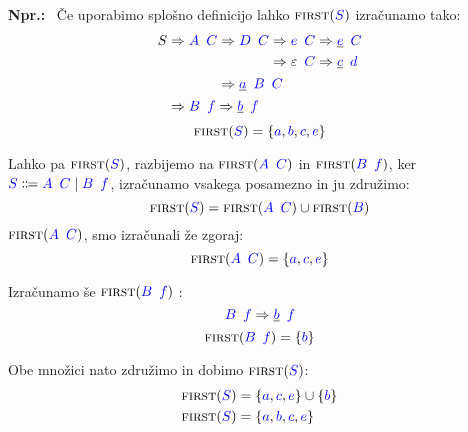 \documentclass{article}
\newcommand{\Ex}{\textbf{Npr.:}\ }
\newcommand{\FIRST}{\textsc{first}}
\newcommand{\Symbol}[1]{\textcolor{blue}{#1}}
\newcommand{\Null}{\varepsilon}
\newcommand{\Arrow}{\Coloneq}
\newcommand{\Derive}{\Rightarrow}
\newcommand{\Seq}{{\ \,}}
\newcommand{\Union}{\mathrel{|}}
\begin{document}
\Ex
Če uporabimo splošno definicijo lahko $\FIRST(\Symbol{S})$ izračunamo tako:
\begin{equation*}
  S \begin{aligned}[t]
    &\Derive \Symbol{A} \Seq \Symbol{C} \begin{aligned}[t]
      &\Derive \Symbol{D} \Seq \Symbol{C} \begin{aligned}[t]
        &\Derive \Symbol{e} \Seq \Symbol{C} \Derive \underline{\Symbol{e}} \Seq \Symbol{C} \\
        &\Derive \Null \Seq \Symbol{C} \Derive \underline{\Symbol{c}} \Seq \Symbol{d} \\
      \end{aligned}\\
      &\Derive \underline{\Symbol{a}} \Seq \Symbol{B} \Seq \Symbol{C}
    \end{aligned}\\
    &\Derive \Symbol{B} \Seq \Symbol{f} \Derive \underline{\Symbol{b}} \Seq \Symbol{f}
  \end{aligned}
\end{equation*}
\begin{equation*}
  \FIRST(\Symbol{S}) = \{\Symbol{a}, \Symbol{b}, \Symbol{c}, \Symbol{e}\}
\end{equation*}

Lahko pa $\FIRST(\Symbol{S})$, razbijemo na $\FIRST(\Symbol{A} \Seq \Symbol{C})$ in $\FIRST(\Symbol{B} \Seq \Symbol{f})$, ker $\Symbol{S} \Arrow \Symbol{A} \Seq \Symbol{C} \Union \Symbol{B} \Seq \Symbol{f}$, izračunamo vsakega posamezno in ju združimo:
\begin{equation*}
  \FIRST(\Symbol{S}) = \FIRST(\Symbol{A} \Seq \Symbol{C}) \cup \FIRST(\Symbol{B})
\end{equation*}
$\FIRST(\Symbol{A} \Seq \Symbol{C})$, smo izračunali že zgoraj:
\begin{equation*}
  \FIRST(\Symbol{A} \Seq \Symbol{C}) = \{\Symbol{a}, \Symbol{c}, \Symbol{e}\}
\end{equation*}

Izračunamo še $\FIRST(\Symbol{B} \Seq \Symbol{f})$ :
\begin{equation*}
  \Symbol{B} \Seq \Symbol{f} \Derive \underline{\Symbol{b}} \Seq \Symbol{f}
\end{equation*}
\begin{equation*}
  \FIRST(\Symbol{B} \Seq \Symbol{f}) = \{\Symbol{b}\}
\end{equation*}

Obe množici nato združimo in dobimo $\FIRST(\Symbol{S})$:
\begin{align*}
  \FIRST(\Symbol{S}) &= \{\Symbol{a}, \Symbol{c}, \Symbol{e}\} \cup \{\Symbol{b}\}\\
  \FIRST(\Symbol{S}) &= \{\Symbol{a}, \Symbol{b}, \Symbol{c}, \Symbol{e}\}
\end{align*}
\end{document}
